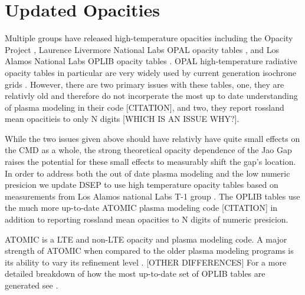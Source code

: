 \section{Updated Opacities}\label{sec:opac}
Multiple groups have released high-temperature opacities including the Opacity
Project \citep[OP][]{Seaton1994}, Laurence Livermore National Labs OPAL opacity
tables \citep{Iglesias1996}, and Los Alamos National Labs OPLIB opacity tables
\citep{Colgan2016}. OPAL high-temperature radiative opacity tables in
particular are very widely used by current generation isochrone grids
\citep[e.g. Dartmouth, MIST, \& StarEvol, ][]{Dotter2008,Choi2016,Amard2019}.
However, there are two primary issues with these tables, one, they are
relativly old and therefore do not incorperate the most up to date
understanding of plasma modeling in their code {\color{red} [CITATION]}, and
two, they report rossland mean opacitieis to only {\color{red} N} digits
{\color{red} [WHICH IS AN ISSUE WHY?]}.

While the two issues given above should have relativly have quite small effects
on the CMD as a whole, the strong theoretical opacity dependence of the Jao Gap
raises the potential for these small effects to measurably shift the gap's
location. In order to address both the out of date plasma modeling and the low
numeric presicion we update DSEP to use high temperature opacity tables based
on measurements from Los Alamos national Labs T-1 group
\citep[OPLIB,][]{Colgan2016}. The OPLIB tables use the much more up-to-date
ATOMIC plasma modeling code {\color{red} [CITATION]} in addition to reporting
rossland mean opacities to {\color{red} N} digits of numeric presicion.

ATOMIC \citep{Magee2004} is a LTE and non-LTE opacity and plasma modeling code.
A major strength of ATOMIC when compared to the older plasma modeling programs
is its ability to vary its refinement level \citep{Fontes2016}.
{\color{red}[OTHER DIFFERENCES]} For a more detailed breakdown of how the most
up-to-date set of OPLIB tables are generated see \citep{Colgan2016}.

